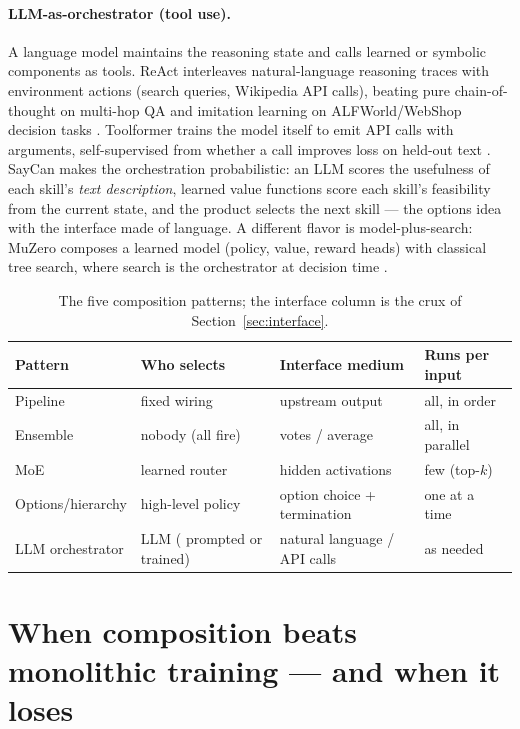 \documentclass[11pt]{article}
\begin{document}
\paragraph{LLM-as-orchestrator (tool use).} A language model maintains the reasoning state and calls learned or symbolic components as tools. ReAct interleaves natural-language reasoning traces with environment actions (search queries, Wikipedia API calls), beating pure chain-of-thought on multi-hop QA and imitation learning on ALFWorld/WebShop decision tasks \cite{yao2023react}. Toolformer trains the model itself to emit API calls with arguments, self-supervised from whether a call improves loss on held-out text \cite{schick2023toolformer}. SayCan makes the orchestration probabilistic: an LLM scores the usefulness of each skill's \emph{text description}, learned value functions score each skill's feasibility from the current state, and the product selects the next skill \cite{ahn2022saycan} --- the options idea with the interface made of language. A different flavor is model-plus-search: MuZero composes a learned model (policy, value, reward heads) with classical tree search, where search is the orchestrator at decision time \cite{schrittwieser2020muzero}.



\begin{table}[h]
\centering
\begin{tabular}{lp{2.9cm}p{3.4cm}p{2.9cm}}
\hline
Pattern & Who selects & Interface medium & Runs per input \\
\hline
Pipeline & fixed wiring & upstream output & all, in order \\
Ensemble & nobody (all fire) & votes / average & all, in parallel \\
MoE & learned router & hidden activations & few (top-$k$) \\
Options/hierarchy & high-level policy & option choice + termination & one at a time \\
LLM orchestrator & LLM ( prompted or trained) & natural language / API calls & as needed \\
\hline
\end{tabular}
\caption{The five composition patterns; the interface column is the crux of Section~\ref{sec:interface}.}
\label{tab:patterns}
\end{table}

\section{When composition beats monolithic training --- and when it loses}
\label{sec:tradeoffs}
\end{document}
